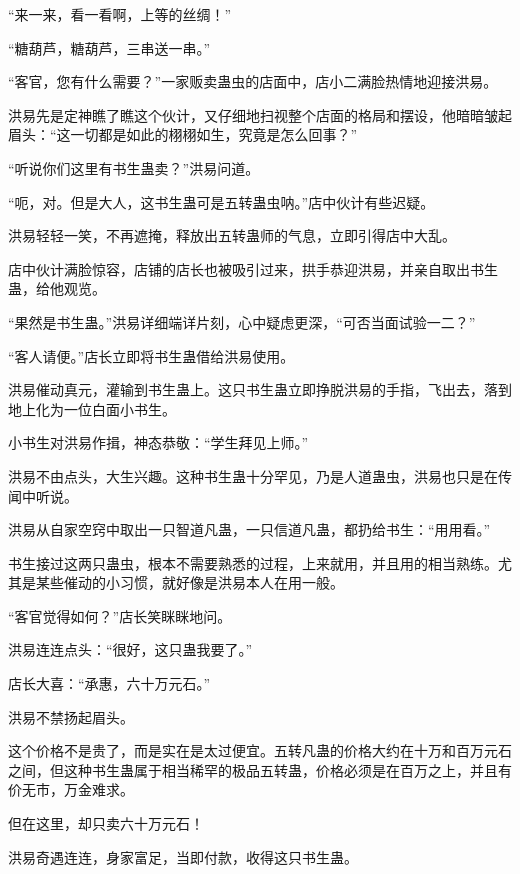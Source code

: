 
\begin{this_body}



“来一来，看一看啊，上等的丝绸！”

“糖葫芦，糖葫芦，三串送一串。”

“客官，您有什么需要？”一家贩卖蛊虫的店面中，店小二满脸热情地迎接洪易。

洪易先是定神瞧了瞧这个伙计，又仔细地扫视整个店面的格局和摆设，他暗暗皱起眉头：“这一切都是如此的栩栩如生，究竟是怎么回事？”

“听说你们这里有书生蛊卖？”洪易问道。

“呃，对。但是大人，这书生蛊可是五转蛊虫呐。”店中伙计有些迟疑。

洪易轻轻一笑，不再遮掩，释放出五转蛊师的气息，立即引得店中大乱。

店中伙计满脸惊容，店铺的店长也被吸引过来，拱手恭迎洪易，并亲自取出书生蛊，给他观览。

“果然是书生蛊。”洪易详细端详片刻，心中疑虑更深，“可否当面试验一二？”

“客人请便。”店长立即将书生蛊借给洪易使用。

洪易催动真元，灌输到书生蛊上。这只书生蛊立即挣脱洪易的手指，飞出去，落到地上化为一位白面小书生。

小书生对洪易作揖，神态恭敬：“学生拜见上师。”

洪易不由点头，大生兴趣。这种书生蛊十分罕见，乃是人道蛊虫，洪易也只是在传闻中听说。

洪易从自家空窍中取出一只智道凡蛊，一只信道凡蛊，都扔给书生：“用用看。”

书生接过这两只蛊虫，根本不需要熟悉的过程，上来就用，并且用的相当熟练。尤其是某些催动的小习惯，就好像是洪易本人在用一般。

“客官觉得如何？”店长笑眯眯地问。

洪易连连点头：“很好，这只蛊我要了。”

店长大喜：“承惠，六十万元石。”

洪易不禁扬起眉头。

这个价格不是贵了，而是实在是太过便宜。五转凡蛊的价格大约在十万和百万元石之间，但这种书生蛊属于相当稀罕的极品五转蛊，价格必须是在百万之上，并且有价无市，万金难求。

但在这里，却只卖六十万元石！

洪易奇遇连连，身家富足，当即付款，收得这只书生蛊。


\end{this_body}
